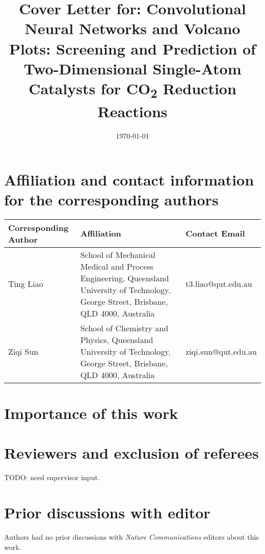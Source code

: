 \documentclass[a4paper, 12pt]{article}
\begin{document}
\title{Cover Letter for: Convolutional Neural Networks and Volcano Plots:
    Screening and Prediction of Two-Dimensional Single-Atom Catalysts
    for CO\textsubscript{2} Reduction Reactions}

\date{\today}
\maketitle
\newpage


\section{Affiliation and contact information for the corresponding authors}

\begin{table}
    \label{cov_let_table:corr_author_contact}
    \centering
    \begin{tabular}{p{3cm}p{6cm}l}
    \toprule
    Corresponding Author  & Affiliation                                             & Contact Email       \\
    \midrule
    Ting Liao             & School of Mechanical Medical and Process Engineering,
                            Queensland University of Technology, George Street,
                            Brisbane, QLD 4000, Australia                           & t3.liao@qut.edu.au   \\
    Ziqi Sun              & School of Chemistry and Physics,
                            Queensland University of Technology, George Street,
                            Brisbane, QLD 4000, Australia                           & ziqi.sun@qut.edu.au  \\
    \bottomrule
    \end{tabular}
\end{table}


\section{Importance of this work}


\section{Reviewers and exclusion of referees}

TODO: need supervisor input.

\section{Prior discussions with editor}

Authors had no prior discussions with \textit{Nature Communications} editors about this work.
\end{document}
